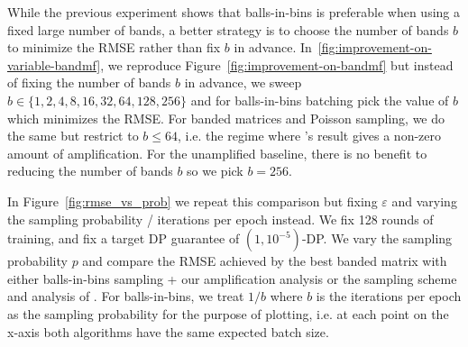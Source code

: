 While the previous experiment shows that balls-in-bins is preferable when using a fixed large number of bands, a better strategy is to choose the number of bands $b$ to minimize the RMSE rather than fix $b$ in advance. In~\cref{fig:improvement-on-variable-bandmf}, we reproduce Figure~\ref{fig:improvement-on-bandmf} but instead of fixing the number of bands $b$ in advance, we sweep $b \in \{1, 2, 4, 8, 16, 32, 64, 128, 256\}$ and for balls-in-bins batching pick the value of $b$ which minimizes the RMSE. For banded matrices and Poisson sampling, we do the same but restrict to $b \leq 64$, i.e. the regime where \citet{choquette2024amplified}'s result gives a non-zero amount of amplification. For the unamplified baseline, there is no benefit to reducing the number of bands $b$ so we pick $b = 256$.

In Figure~\ref{fig:rmse_vs_prob} we repeat this comparison but fixing $\varepsilon$ and varying the sampling probability / iterations per epoch instead. We fix 128 rounds of training, and fix a target DP guarantee of $(1, 10^{-5})$-DP. We vary the sampling probability $p$ and compare the RMSE achieved by the best banded matrix with either balls-in-bins sampling + our amplification analysis or the sampling scheme and analysis of \citet{choquette2024amplified}. For balls-in-bins, we treat $1 / b$ where $b$ is the iterations per epoch as the sampling probability for the purpose of plotting, i.e. at each point on the x-axis both algorithms have the same expected batch size.


